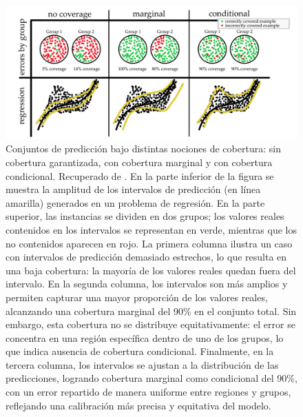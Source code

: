 \begin{figure}[h]
    \centering
    \includegraphics[width=\textwidth]{capitulos/cap_02/imagenes/coverage_types.png}
    \caption[
        Conjuntos de predicción bajo distintas nociones de cobertura: sin cobertura garantizada, con 
        cobertura marginal y con cobertura condicional. Recuperado de \cite{angelopoulos2021}.
    ]{
        Conjuntos de predicción bajo distintas nociones de cobertura: sin cobertura garantizada, con 
        cobertura marginal y con cobertura condicional. Recuperado de \cite{angelopoulos2021}.
        En la parte inferior de la figura se muestra la amplitud de los intervalos de predicción (en línea 
        amarilla) generados en un problema de regresión. En la parte superior, las instancias se dividen en 
        dos grupos; los valores reales contenidos en los intervalos se representan en verde, mientras que los 
        no contenidos aparecen en rojo.
        La primera columna ilustra un caso con intervalos de predicción demasiado estrechos, lo que resulta 
        en una baja cobertura: la mayoría de los valores reales quedan fuera del intervalo.
        En la segunda columna, los intervalos son más amplios y permiten capturar una mayor proporción de los 
        valores reales, alcanzando una cobertura marginal del 90\% en el conjunto total. Sin embargo, esta 
        cobertura no se distribuye equitativamente: el error se concentra en una región específica dentro 
        de uno de los grupos, lo que indica ausencia de cobertura condicional.
        Finalmente, en la tercera columna, los intervalos se ajustan a la distribución de las predicciones,
        logrando cobertura marginal como condicional del 90\%, con un error repartido de manera uniforme 
        entre regiones y grupos, reflejando una calibración más precisa y equitativa del modelo.
    } 
    \label{fig:coverage}
\end{figure}

